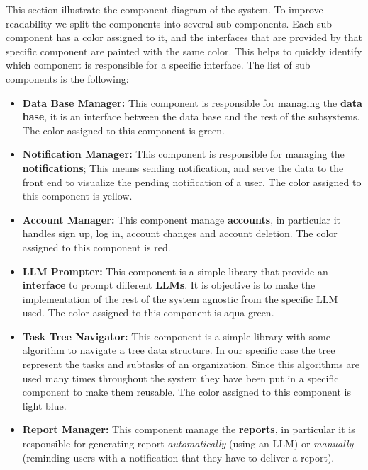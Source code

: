 \documentclass{article}
\begin{document}
This section illustrate the component diagram of the system. To improve readability we split the components into several sub
components.
Each sub component has a color assigned to it, and the interfaces that are provided by that specific component are painted with the same color.
This helps to quickly identify which component is responsible for a specific interface.
\newline \newline
The list of sub components is the following:
\begin{itemize}
    \item \textcolor[HTML]{8CC86E}{\textbf{Data Base Manager: }} This component is responsible for managing the \textbf{data base}, it is an interface between
          the data base and the rest of the subsystems. The color assigned to this component is \textcolor[HTML]{8CC86E}{green}.
    \item \textcolor[HTML]{F0C832}{\textbf{Notification Manager: }} This component is responsible for managing the \textbf{notifications};
          This means sending notification, and serve the data to the front end to visualize the pending notification of a user. The color assigned to this component is \textcolor[HTML]{F0C832}{yellow}.
    \item \textcolor[HTML]{FF0000}{\textbf{Account Manager: }} This component manage \textbf{accounts}, in particular it handles sign up, log in, account changes and account deletion.
          The color assigned to this component is \textcolor[HTML]{FF0000}{red}.
    \item \textcolor[HTML]{64C8BE}{\textbf{LLM Prompter: }} This component is a simple library that provide an \textbf{interface} to prompt different \textbf{LLMs}. It is objective is to make the
          implementation of the rest of the system agnostic from the specific LLM used. The color assigned to this component is \textcolor[HTML]{64C8BE}{aqua green}.
    \item \textcolor[HTML]{A0C8F0}{\textbf{Task Tree Navigator: }} This component is a simple library with some algorithm to navigate a tree data structure.
          In our specific case the tree represent the tasks and subtasks of an organization. Since this algorithms are used many
          times throughout the system they have been put in a specific component to make them reusable. The color assigned to this component is \textcolor[HTML]{A0C8F0}{light blue}.
    \item \textcolor[HTML]{FA9646}{\textbf{Report Manager: }} This component manage the \textbf{reports}, in particular it is responsible for generating report \textit{automatically} (using an LLM) or \textit{manually} (reminding users with a notification that they have to deliver a report).

\end{itemize}
\end{document}
